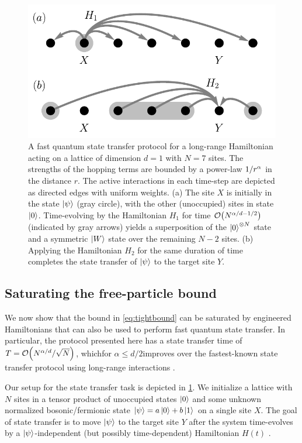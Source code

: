 \begin{figure}
\centering
\includegraphics[width=0.5\linewidth]{figures/test_gong_protocol3.pdf}
\caption{A fast quantum state transfer protocol for a long-range Hamiltonian acting on a lattice of dimension $d=1$ with $N=7$ sites. The strengths of the hopping terms are bounded by a power-law $1/r^{\alpha}$ in the distance $r$. The active interactions in each time-step are depicted as directed edges with uniform weights. (a) The site $X$ is initially in the state $\left | \psi \right\rangle$ (gray circle), with the other (unoccupied) sites in state $\left | 0 \right\rangle$. Time-evolving by the Hamiltonian $H_1$ for time $\O{N^{\al/d-1/2}}$  (indicated by gray arrows) yields a superposition of the $\left | 0 \right\rangle^{\otimes N}$ state and a symmetric $\left | W \right\rangle$ state over the remaining $N-2$ sites. (b) Applying the Hamiltonian $H_2$ for the same duration of time completes the state transfer of $\left | \psi \right\rangle$ to the target site $Y$.}
\label{Fig_Gong}
\end{figure}

\subsection{Saturating the free-particle bound}
We now show that the bound in \cref{eq:tightbound} can be saturated by engineered Hamiltonians that can also be used to perform fast quantum state transfer. In particular, the protocol presented here has a state transfer time of $T = \O{N^{\alpha/d}/\sqrt{N}}$, which\dash for $\alpha\le d/2$\dash improves over the fastest-known state transfer protocol using long-range interactions \cite{Eldredge2017}.

Our setup for the state transfer task is depicted in \cref{Fig_Gong}. We initialize a lattice with $N$ sites in a tensor product of unoccupied states $\left | 0 \right\rangle$ and some unknown normalized bosonic/fermionic state $\left | \psi \right\rangle = a\left | 0 \right\rangle+b\left | 1 \right\rangle$ on a single site $X$.
The goal of state transfer is to move $\left | \psi \right\rangle$ to the target site $Y$ after the system time-evolves by a $\left | \psi \right\rangle$-independent (but possibly time-dependent) Hamiltonian $H(t)$ \cite{NJ2014,Epstein17}.

